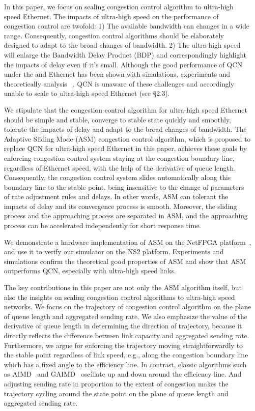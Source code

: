 \documentclass{sig-alternate-10pt}
\begin{document}
In this paper, we focus on scaling congestion control algorithm to ultra-high speed Ethernet. The impacts of ultra-high speed on the performance of congestion control are twofold: 1) The available bandwidth can changes in a wide range. Consequently, congestion control algorithms should be elaborately designed to adapt to the broad changes of bandwidth. 2) The ultra-high speed will enlarge the Bandwidth Delay Product (BDP) and correspondingly highlight the impacts of delay even if it's small. Although the good performance of QCN under the  and  Ethernet has been shown with simulations, experiments and theoretically analysis ~\cite{sim2,qcn-netfpga, average}, QCN is unaware of these challenges and accordingly unable to scale to ultra-high speed Ethernet (see \S2.3).


We stipulate that the congestion control algorithm for ultra-high speed Ethernet should be simple and stable, converge to stable state quickly  and smoothly, tolerate the impacts of delay and adapt to the broad changes of bandwidth. The Adaptive Sliding Mode (ASM) congestion control algorithm, which is proposed to replace QCN for ultra-high speed Ethernet in this paper, achieves these goals by enforcing congestion control system staying at the congestion boundary line, regardless of Ethernet speed, with the help of the derivative of queue length. Consequently, the congestion control system slides automatically along this boundary line to the stable point, being insensitive to the change of parameters of rate adjustment rules and  delays. In other words, ASM can tolerant the impacts of delay and its convergence process is smooth. Moreover, the sliding process and the approaching process are separated in ASM, and the approaching process can be accelerated independently for short response time. 


We demonstrate a hardware implementation of ASM on the NetFPGA platform~\cite{netfpga}, and use it to verify our simulator on the NS2 platform. Experiments and simulations confirm the theoretical good properties of ASM and show that ASM outperforms QCN, especially with ultra-high speed links.

The key contributions in this paper are not only the ASM algorithm itself, but also the insights on scaling congestion control algorithms to  ultra-high speed networks. We focus on the trajectory of congestion control algorithm on the plane of queue length and aggregated sending rate. We also emphasize the value of the derivative of queue length in determining the direction of trajectory, because it directly reflects the difference between link capacity and aggregated sending rate. Furthermore, we argue for enforcing the trajectory moving straightforwardly to the stable point regardless of link speed, e.g., along the congestion boundary line which has a fixed angle to the efficiency line. In contrast, classic algorithms such as AIMD~\cite{AIMD} and GAIMD~\cite{GAIMD} oscillate up and down around the efficiency line. And adjusting sending rate in proportion to the extent of congestion makes the trajectory cycling around the state point on the plane of queue length and aggregated sending rate. 
\end{document}
